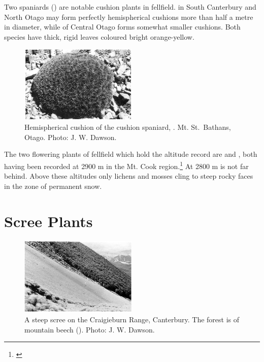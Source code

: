 Two spaniards () are notable cushion plants in fellfield.  in South Canterbury and North Otago may form perfectly hemispherical cushions more than half a metre in diameter, while  of Central Otago forms somewhat smaller cushions.
Both species have thick, rigid leaves coloured bright orange-yellow.

\begin{figure}
	\includegraphics[width=0.5\textwidth]{graphics/figure110cushion-spaniard.jpg}
	\centering
	\caption[Hemispherical cushion of the cushion spaniard]{Hemispherical cushion of the cushion spaniard, .
	Mt. St.\ Bathans, Otago.
	Photo: J. W. Dawson.}%
	\label{fig:110cushion-spaniard}
\end{figure}

The two flowering plants of fellfield which hold the altitude record are  and , both having been recorded at 2900 m in the Mt.
Cook region.\footnote{\cite{wilson1978wild}}
At 2800 m  is not far behind.
Above these altitudes only lichens and mosses cling to steep rocky faces in the zone of permanent snow.

\section{Scree Plants}

\begin{figure}
	\includegraphics[width=0.5\textwidth]{graphics/figure111craigieburn.jpg}
	\centering
	\caption[A steep scree on the Craigieburn Range]{A steep scree on the Craigieburn Range, Canterbury.
	The forest is of mountain beech ().
	Photo: J. W. Dawson.}%
	\label{fig:111craigieburn}
\end{figure}

